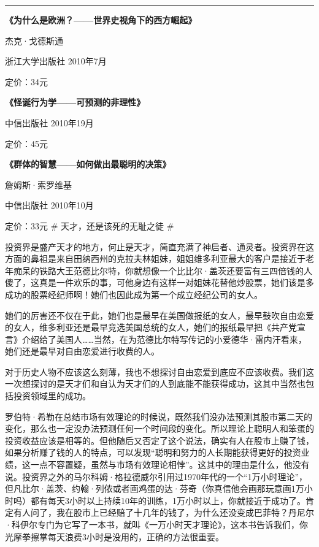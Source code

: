 \begin{center}\rule{3in}{0.4pt}\end{center}

\textbf{《为什么是欧洲？------世界史视角下的西方崛起》}

杰克·戈德斯通

浙江大学出版社 2010年7月

定价：34元

\textbf{《怪诞行为学------可预测的非理性》}

中信出版社 2010年19月

定价：45元

\textbf{《群体的智慧------如何做出最聪明的决策》}

詹姆斯·索罗维基

中信出版社 2010年10月

定价：33元 \# 天才，还是该死的无耻之徒 \#

投资界是盛产天才的地方，何止是天才，简直充满了神启者、通灵者。投资界在这方面的鼻祖是来自田纳西州的克拉夫林姐妹，姐姐维多利亚最大的客户是接近于老年痴呆的铁路大王范德比尔特，你就想像一个比比尔·盖茨还要富有三四倍钱的人傻了，这真是一件欢乐的事，可他身边有这样一对姐妹花替他炒股票，她们该是多成功的股票经纪师啊！她们也因此成为第一个成立经纪公司的女人。

她们的厉害还不仅在于此，她们也是最早在美国做报纸的女人，最早鼓吹自由恋爱的女人，维多利亚还是最早竞选美国总统的女人，她们的报纸最早把《共产党宣言》介绍给了美国人\ldots{}\ldots{}当然，在为范德比尔特写传记的小爱德华·雷内汗看来，她们还是最早对自由恋爱进行收费的人。

对于历史人物不应该这么刻薄，我也不想探讨自由恋爱到底应不应该收费。我们这一次想探讨的是天才们和自认为天才们的人到底能不能获得成功，这其中当然也包括投资领域里的成功。

罗伯特·希勒在总结市场有效理论的时候说，既然我们没办法预测其股市第二天的变化，那么也一定没办法预测任何一个时间段的变化。所以理论上聪明人和笨蛋的投资收益应该是相等的。但他随后又否定了这个说法，确实有人在股市上赚了钱，如果分析赚了钱的人的特点，可以发现``聪明和努力的人长期能获得更好的投资业绩，这一点不容置疑，虽然与市场有效理论相悖''。这其中的理由是什么，他没有说。投资界之外的马尔科姆·格拉德威尔引用过1970年代的一个``1万小时理论''，但凡比尔·盖茨、约翰·列侬或者画鸡蛋的达·芬奇（你真信他会画那玩意画1万小时吗）都有每天3小时以上持续10年的训练，1万小时以上，你就接近于成功了。肯定有人问了，我在股市上已经赔了十几年的钱了，为什么还没变成巴菲特？丹尼尔·科伊尔专门为它写了一本书，就叫《一万小时天才理论》，这本书告诉我们，你光摩拳擦掌每天浪费3小时是没用的，正确的方法很重要。

